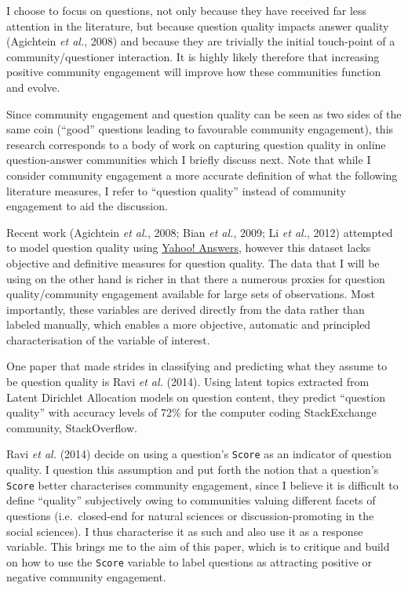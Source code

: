\documentclass[12pt,preprint, authoryear]{article}
\numberwithin{equation}{section}
\numberwithin{figure}{section}
\numberwithin{table}{section}
\begin{document}
I choose to focus on questions, not only because they have received far
less attention in the literature, but because question quality impacts
answer quality (Agichtein \emph{et al.}, 2008) and because they are
trivially the initial touch-point of a community/questioner interaction.
It is highly likely therefore that increasing positive community
engagement will improve how these communities function and evolve.

Since community engagement and question quality can be seen as two sides
of the same coin (``good'' questions leading to favourable community
engagement), this research corresponds to a body of work on capturing
question quality in online question-answer communities which I briefly
discuss next. Note that while I consider community engagement a more
accurate definition of what the following literature measures, I refer
to ``question quality'' instead of community engagement to aid the
discussion.

Recent work (Agichtein \emph{et al.}, 2008; Bian \emph{et al.}, 2009; Li
\emph{et al.}, 2012) attempted to model question quality using
\href{http://answers.yahoo.com}{Yahoo! Answers}, however this dataset
lacks objective and definitive measures for question quality. The data
that I will be using on the other hand is richer in that there a
numerous proxies for question quality/community engagement available for
large sets of observations. Most importantly, these variables are
derived directly from the data rather than labeled manually, which
enables a more objective, automatic and principled characterisation of
the variable of interest.

One paper that made strides in classifying and predicting what they
assume to be question quality is Ravi \emph{et al.} (2014). Using latent
topics extracted from Latent Dirichlet Allocation models on question
content, they predict ``question quality'' with accuracy levels of 72\%
for the computer coding StackExchange community, StackOverflow.

Ravi \emph{et al.} (2014) decide on using a question's \texttt{Score} as
an indicator of question quality. I question this assumption and put
forth the notion that a question's \texttt{Score} better characterises
community engagement, since I believe it is difficult to define
``quality'' subjectively owing to communities valuing different facets
of questions (i.e.~closed-end for natural sciences or
discussion-promoting in the social sciences). I thus characterise it as
such and also use it as a response variable. This brings me to the aim
of this paper, which is to critique and build on how to use the
\texttt{Score} variable to label questions as attracting positive or
negative community engagement.
\end{document}
